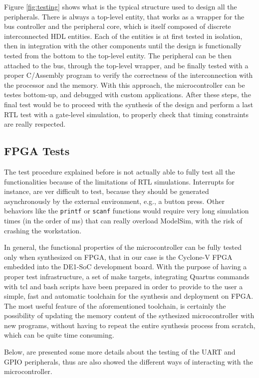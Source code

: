 Figure \ref{fig:testing} shows what is the typical structure used to design all the peripherals. There is always a top-level entity, that works as a wrapper for the bus controller and the peripheral core, which is itself composed of discrete interconnected HDL entities. Each of the entities is at first tested in isolation, then in integration with the other components until the design is functionally tested from the bottom to the top-level entity. The peripheral can be then attached to the bus, through the top-level wrapper, and be finally tested with a proper C/Assembly program to verify the correctness of the interconnection with the processor and the memory. With this approach, the microcontroller can be testes bottom-up, and debugged with custom applications. After these steps, the final test would be to proceed with the synthesis of the design and perform a last RTL test with a gate-level simulation, to properly check that timing constraints are really respected. 

\subsection{FPGA Tests}
The test procedure explained before is not actually able to fully test all the functionalities because of the limitations of RTL simulations. Interrupts for instance, are ver difficult to test, because they should be generated asynchronously by the external environment, e.g., a button press. Other behaviors like the \texttt{printf} or \texttt{scanf} functions would require very long simulation times (in the order of ms) that can really overload ModelSim, with the risk of crashing the workstation.

In general, the functional properties of the microcontroller can be fully tested only when synthesized on FPGA, that in our case is the Cyclone-V FPGA embedded into the DE1-SoC development board. With the purpose of having a proper test infrastructure, a set of make targets, integrating Quartus commands with tcl and bash scripts have been prepared in order to provide to the user a simple, fast and automatic toolchain for the synthesis and deployment on FPGA. The most useful feature of the aforementioned toolchain, is certainly the possibility of updating the memory content of the sythesized microcontroller with new programs, without having to repeat the entire synthesis process from scratch, which can be quite time consuming.

Below, are presented some more details about the testing of the UART and GPIO peripherals, thus are also showed the different ways of interacting with the microcontroller.

